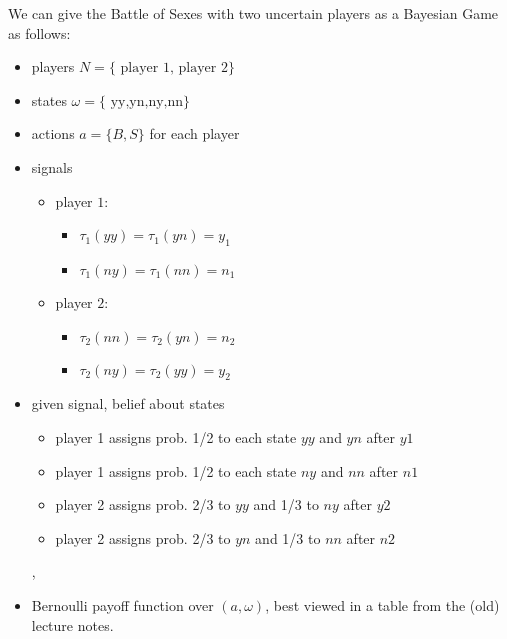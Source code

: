 \begin{example}
      We can give the Battle of Sexes with two uncertain players as a Bayesian Game as follows:
      \begin{itemize}
            \item players $N = \{\text{ player 1, player 2}\}$
            \item states $\omega = \{\text { yy,yn,ny,nn}\}$
            \item actions $a = \{ B , S \}$ for each player
            \item signals
                  \begin{itemize}
                        \item  player $1$:
                              \begin{itemize}
                                    \item $\tau_1(yy) = \tau_1(yn) = y_1$
                                    \item $\tau_1(ny) = \tau_1(nn) = n_1$
                              \end{itemize}
                        \item  player $2$:
                              \begin{itemize}
                                    \item $\tau_2(nn) = \tau_2(yn) = n_2$
                                    \item $\tau_2(ny) = \tau_2(yy) = y_2$
                              \end{itemize}
                  \end{itemize}
            \item given signal, belief about states
                  \begin{itemize}
                        \item player 1 assigns prob. 1/2 to each state $yy$ and $yn$ after $y 1 $
                        \item player 1 assigns prob. 1/2 to each state $ny$ and $nn$ after $n 1 $
                        \item player 2 assigns prob. 2/3 to $yy$ and 1/3 to $ny$ after $y 2 $
                        \item player 2 assigns prob. 2/3 to $yn$ and 1/3 to $nn$ after $n 2$
                  \end{itemize},
            \item Bernoulli payoff function over $(a, \omega)$, best viewed in a table from the (old) lecture notes.
      \end{itemize}
\end{example}


